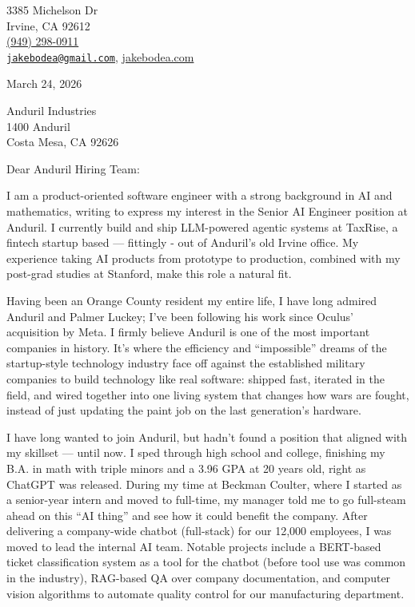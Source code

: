 \documentclass[
]{article}
\author{}
\date{}
\begin{document}
3385 Michelson Dr\\
Irvine, CA 92612\\
\href{tel:+19492980911}{(949) 298-0911}\\
\href{mailto:jakebodea@gmail.com}{\nolinkurl{jakebodea@gmail.com}},
\href{http://jakebodea.com}{jakebodea.com}

March 24, 2026

Anduril Industries\\
1400 Anduril\\
Costa Mesa, CA 92626

\vspace{\baselineskip}

Dear Anduril Hiring Team:

I am a product-oriented software engineer with a strong background in AI
and mathematics, writing to express my interest in the Senior AI
Engineer position at Anduril. I currently build and ship LLM-powered
agentic systems at TaxRise, a fintech startup based --- fittingly - out
of Anduril's old Irvine office. My experience taking AI products from
prototype to production, combined with my post-grad studies at Stanford,
make this role a natural fit.

Having been an Orange County resident my entire life, I have long
admired Anduril and Palmer Luckey; I've been following his work since
Oculus' acquisition by Meta. I firmly believe Anduril is one of the most
important companies in history. It's where the efficiency and
``impossible'' dreams of the startup-style technology industry face off
against the established military companies to build technology like real
software: shipped fast, iterated in the field, and wired together into
one living system that changes how wars are fought, instead of just
updating the paint job on the last generation's hardware.

I have long wanted to join Anduril, but hadn't found a position that
aligned with my skillset --- until now. I sped through high school and
college, finishing my B.A. in math with triple minors and a 3.96 GPA at
20 years old, right as ChatGPT was released. During my time at Beckman
Coulter, where I started as a senior-year intern and moved to full-time,
my manager told me to go full-steam ahead on this ``AI thing'' and see
how it could benefit the company. After delivering a company-wide
chatbot (full-stack) for our 12,000 employees, I was moved to lead the
internal AI team. Notable projects include a BERT-based ticket
classification system as a tool for the chatbot (before tool use was
common in the industry), RAG-based QA over company documentation, and
computer vision algorithms to automate quality control for our
manufacturing department.
\end{document}
